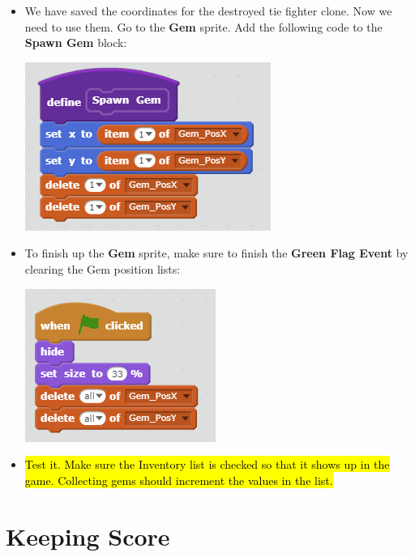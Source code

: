 \documentclass[12pt]{article}
\begin{document}
\begin{itemize}
		\item We have saved the coordinates for the destroyed tie fighter clone. Now we need to use them. Go to the \textbf{Gem} sprite. Add the following code to the \textbf{Spawn Gem} block:
		\begin{center}
    		\includegraphics[scale = 0.5]{./Images/Gem_Spawn.png}
		\end{center}
		\item To finish up the \textbf{Gem} sprite, make sure to finish the \textbf{Green Flag Event} by clearing the Gem position lists:
		\begin{center}
    		\includegraphics[scale = 0.75]{./Images/Gem_Initialize_2.png}
		\end{center}
		\item \hl{Test it. Make sure the Inventory list is checked so that it shows up in the game. Collecting gems should increment the values in the list.}

	\end{itemize}










\section *{Keeping Score}
	
\end{document}
